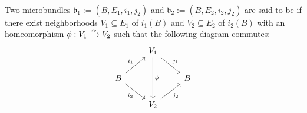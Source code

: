 \\ Two microbundles $\mathfrak{b}_1 := (B, E_1, i_1, j_2)$ and $\mathfrak{b}_2 := (B, E_2, i_2, j_2)$ are said to be  if there exist neighborhoods $V_1 \subseteq E_1$ of $i_1(B)$ and $V_2 \subseteq E_2$ of $i_2(B)$ with an homeomorphism $\phi: V_1 \xrightarrow{\sim} V_2$ such that the following diagram commutes: 
\[\begin{tikzcd}
    & V_1 \ar[dr, "j_1"] \ar[dd, "\phi"] & \\
    B \ar[ur, "i_1"] \ar[dr, "i_2"'] & & B \\
    & V_2 \ar[ur, "j_2"'] &
\end{tikzcd}\]